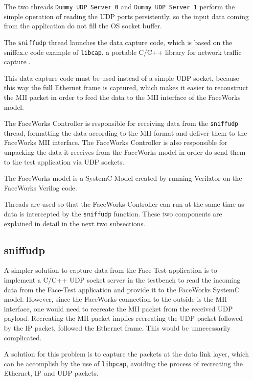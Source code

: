 \documentclass[conference]{IEEEtran}
\begin{document}
The two threads \texttt{Dummy UDP Server 0} and \texttt{Dummy UDP Server 1} perform the simple operation of reading the UDP ports persistently, so the input data coming from the application do not fill the OS socket buffer.

The {\tt sniffudp} thread launches the data capture code, which is based on the sniffex.c code example of {\tt libcap}, a portable C/C++ library for network traffic capture \cite{sniffer}. 

This data capture code must be used instead of a simple UDP socket, because this way the full Ethernet frame is captured, which makes it easier to reconstruct the MII packet in order to feed the data to the MII interface of the FaceWorks model.

The FaceWorks Controller is responsible for receiving data from the \texttt{sniffudp} thread, formatting the data according to the MII format and deliver them to the FaceWorks MII interface. The FaceWorks Controller is also responsible for unpacking the data it receives from the FaceWorks model in order do send them to the test application via UDP sockets.

The FaceWorks model is a SystemC Model created by running Verilator on the FaceWorks Verilog code.

Threads are used so that the FaceWorks Controller can run at the same time as data is intercepted by the {\tt sniffudp} function. These two components are explained in detail in the next two subsections.

\subsection{sniffudp}

A simpler solution to capture data from the Face-Test application is to implement a C/C++ UDP socket server in the testbench to read the incoming data from the Face-Test application and provide it to the FaceWorks SystemC model. However, since the FaceWorks connection to the outside is the MII interface, one would need to recreate the MII packet from the received UDP payload. Recreating the MII packet implies recreating the UDP packet followed by the IP packet, followed the Ethernet frame. This would be unnecessarily complicated.

A solution for this problem is to capture the packets at the data link layer, which can be accomplish by the use of \texttt{libpcap}, avoiding the process of recreating the Ethernet, IP and UDP packets.
\end{document}
